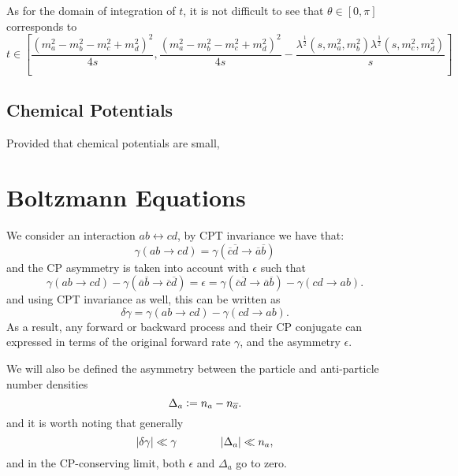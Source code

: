 \documentclass[
  a4paper,             %
  11pt,                %
  oneside,             %
  onecolumn,           %
  bibliography=totoc,  %
  final,               %
]{scrartcl}
\begin{document}
As for the domain of integration of \(t\), it is not difficult to see that
\(\theta \in [0, \pi]\) corresponds to
\begin{equation}
  t \in \left[
    \frac{\left( m_a^2 - m_b^2 - m_c^2 + m_d^2 \right)^2}{4 s},
    \frac{\left( m_a^2 - m_b^2 - m_c^2 + m_d^2 \right)^2}{4 s}
    - \frac{\lambda^{\frac{1}{2}}(s, m_a^2, m_b^2) \lambda^{\frac{1}{2}}(s, m_c^2, m_d^2)}{s}
    \right]
\end{equation}

\subsection{Chemical Potentials}
\label{sec:chemical_potentials}

Provided that chemical potentials are small, 

\cleardoublepage
\section{Boltzmann Equations}%
\label{sec:boltzmann_equation}

We consider an interaction \(ab \leftrightarrow cd\), by \gls{CPT}
invariance we have that:
\begin{equation}
  \gamma(ab \to cd) = \gamma(\overline{c} \overline{d} \to \overline{a} \overline{b})
\end{equation}
and the \gls{CP} asymmetry is taken into account with \(\epsilon\) such
that
\begin{equation}
  \gamma(ab \to cd) - \gamma(\overline{a} \overline{b} \to \overline{c} \overline{d})
  = \epsilon
  = \gamma(\overline{c} \overline{d} \to \overline{a} \overline{b}) - \gamma(cd \to ab).
\end{equation}
and using \gls{CPT} invariance as well, this can be written as
\begin{equation}
  \delta\gamma = \gamma(ab \to cd) - \gamma(cd \to ab).
\end{equation}
As a result, any forward or backward process and their \gls{CP}
conjugate can expressed in terms of the original forward rate \(\gamma\), and
the asymmetry \(\epsilon\).

We will also be defined the asymmetry between the particle and anti-particle
number densities
\begin{equation}
  \Delta_a \vcentcolon= n_a - n_{\overline a}.
\end{equation}
and it is worth noting that generally
\begin{equation}
  \lvert\delta\gamma\rvert \ll \gamma \qquad\qquad \lvert\Delta_a\rvert \ll n_a,
\end{equation}
and in the \gls{CP}-conserving limit, both \(\epsilon\) and \(\Delta_a\)
go to zero.
\end{document}
